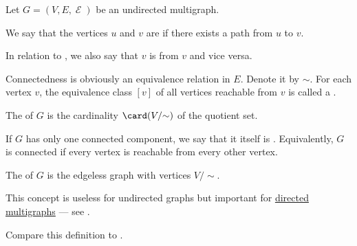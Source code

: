 \begin{definition}\label{def:undirected_multigraph_connectedness}
  Let \( G = (V, E, \mscrE) \) be an undirected multigraph.

  \begin{thmenum}
     We say that the vertices \( u \) and \( v \) are  if there exists a path from \( u \) to \( v \).

    In relation to , we also say that \( v \) is  from \( v \) and vice versa.

     Connectedness is obviously an equivalence relation in \( E \). Denote it by \( {\sim} \). For each vertex \( v \), the equivalence class \( [v] \) of all vertices reachable from \( v \) is called a .

    The  of \( G \) is the cardinality \( \card(V / {\sim}) \) of the quotient set.

    If \( G \) has only one connected component, we say that it itself is . Equivalently, \( G \) is connected if every vertex is reachable from every other vertex.

     The  of \( G \) is the edgeless graph with vertices \( V / {\sim} \).

    This concept is useless for undirected graphs but important for \hyperref[def:directed_multigraph]{directed multigraphs} --- see .
  \end{thmenum}

  Compare this definition to .
\end{definition}
